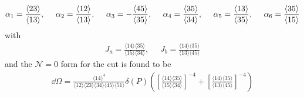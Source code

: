 \documentclass[letter,11pt]{article}
\newcommand{\ab}[1]{\langle #1 \rangle}
\begin{document}
\begin{equation}
	\begin{aligned}
		&\alpha_1=\frac{\expval{23}}{\expval{13}},~~~~
		\alpha_2=\frac{\expval{12}}{\expval{13}},~~~~
		\alpha_3=-\frac{\expval{45}}{\expval{35}},~~~~
		\alpha_4=\frac{\expval{35}}{\expval{34}},~~~~
		\alpha_5=\frac{\expval{13}}{\expval{35}},~~~~
		\alpha_6=\frac{\expval{35}}{\expval{15}}\\
		\end{aligned}
\end{equation}
with 
\begin{equation}
	\begin{aligned}
		J_a=\frac{\ab{14}\ab{35}}{\ab{15}\ab{34}},~~~~~~J_b=\frac{\ab{14}\ab{35}}{\ab{13}\ab{45}}
	\end{aligned}
\end{equation}
and the $\mathcal{N}=0$ form for the cut is found to be
\begin{equation}
	\begin{aligned}
		\dd \Omega
		=\frac{\ab{14}^4}{\ab{12}\ab{23}\ab{34}\ab{45}\ab{51}}\delta(P)\left(\left[\frac{\ab{14}\ab{35}}{\ab{15}\ab{34}}\right]^{-4}+\left[\frac{\ab{14}\ab{35}}{\ab{13}\ab{45}}\right]^{-4}\right)
	\end{aligned}
\end{equation}
\end{document}
